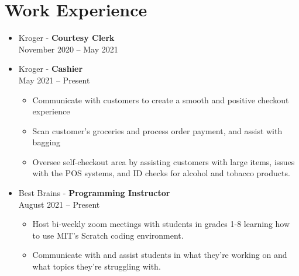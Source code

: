 \documentclass[10pt]{article}
\begin{document}
\section{Work Experience}
\begin{itemize}
	\item Kroger - \textbf{Courtesy Clerk} \\ November 2020 -- May 2021
	\item Kroger - \textbf{Cashier} \\ May 2021 -- Present
	\begin{itemize}
		\item Communicate with customers to create a smooth and positive checkout experience
		\item Scan customer’s groceries and process order payment, and assist with bagging
		\item Oversee self-checkout area by assisting customers with large items, issues with the POS systems, and ID checks for alcohol and tobacco products.
	\end{itemize}
	\item Best Brains - \textbf{Programming Instructor}\\August 2021 -- Present
	\begin{itemize}
		\item Host bi-weekly zoom meetings with students in grades 1-8 learning how to use MIT's Scratch coding environment.
		\item Communicate with and assist students in what they're working on and what topics they're struggling with.
	\end{itemize}
\end{itemize}
\end{document}
